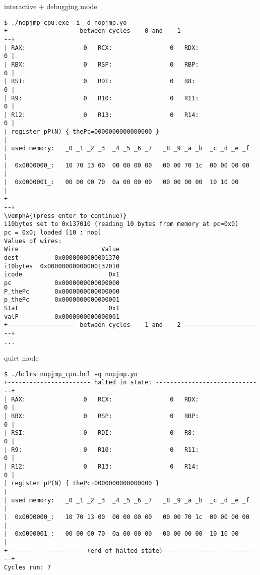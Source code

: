\begin{frame}[fragile,label=interDebugNopJmp]{interactive + debugging mode}
\begin{Verbatim}[fontsize=\fontsize{8}{9}\selectfont,commandchars=\\\{\}]
$ ./nopjmp_cpu.exe -i -d nopjmp.yo
+------------------- between cycles    0 and    1 ----------------------+
| RAX:                0   RCX:                0   RDX:                0 |
| RBX:                0   RSP:                0   RBP:                0 |
| RSI:                0   RDI:                0   R8:                 0 |
| R9:                 0   R10:                0   R11:                0 |
| R12:                0   R13:                0   R14:                0 |
| register pP(N) { thePc=0000000000000000 }                             |
| used memory:   _0 _1 _2 _3  _4 _5 _6 _7   _8 _9 _a _b  _c _d _e _f    |
|  0x0000000_:   10 70 13 00  00 00 00 00   00 00 70 1c  00 00 00 00    |
|  0x0000001_:   00 00 00 70  0a 00 00 00   00 00 00 00  10 10 00       |
+-----------------------------------------------------------------------+
\vemphA{(press enter to continue)}
i10bytes set to 0x137010 (reading 10 bytes from memory at pc=0x0)
pc = 0x0; loaded [10 : nop]
Values of wires:
Wire                       Value
dest          0x0000000000001370
i10bytes  0x00000000000000137010
icode                        0x1
pc            0x0000000000000000
P_thePc       0x0000000000000000
p_thePc       0x0000000000000001
Stat                         0x1
valP          0x0000000000000001
+------------------- between cycles    1 and    2 ----------------------+
...
\end{Verbatim}
\end{frame}


\begin{frame}[fragile,label=quietNopJmp]{quiet mode}
\begin{Verbatim}[fontsize=\fontsize{8}{9}\selectfont]
$ ./hclrs nopjmp_cpu.hcl -q nopjmp.yo
+----------------------- halted in state: ------------------------------+
| RAX:                0   RCX:                0   RDX:                0 |
| RBX:                0   RSP:                0   RBP:                0 |
| RSI:                0   RDI:                0   R8:                 0 |
| R9:                 0   R10:                0   R11:                0 |
| R12:                0   R13:                0   R14:                0 |
| register pP(N) { thePc=0000000000000000 }                             |
| used memory:   _0 _1 _2 _3  _4 _5 _6 _7   _8 _9 _a _b  _c _d _e _f    |
|  0x0000000_:   10 70 13 00  00 00 00 00   00 00 70 1c  00 00 00 00    |
|  0x0000001_:   00 00 00 70  0a 00 00 00   00 00 00 00  10 10 00       |
+--------------------- (end of halted state) ---------------------------+
Cycles run: 7
\end{Verbatim}
\end{frame}

